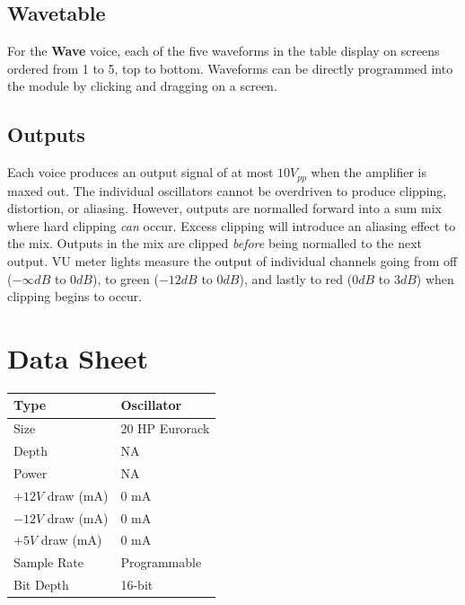 \documentclass[12pt,letter]{article}
\begin{document}
\subsection{Wavetable}

For the \textbf{Wave} voice, each of the five waveforms in the table display on screens ordered from 1 to 5, top to bottom. Waveforms can be directly programmed into the module by clicking and dragging on a screen.

\subsection{Outputs}

Each voice produces an output signal of at most $10V_{pp}$ when the amplifier is maxed out. The individual oscillators cannot be overdriven to produce clipping, distortion, or aliasing. However, outputs are normalled forward into a sum mix where hard clipping \textit{can} occur. Excess clipping will introduce an aliasing effect to the mix. Outputs in the mix are clipped \textit{before} being normalled to the next output. VU meter lights measure the output of individual channels going from off ($-\infty dB$ to $0dB$), to green ($-12dB$ to $0dB$), and lastly to red ($0dB$ to $3dB$) when clipping begins to occur.


\clearpage
\section{Data Sheet}

\begin{table}[!htp]
\begin{tabular}{|l|l|}
\hline
Type             & Oscillator               \\
\hline
Size             & 20 HP Eurorack           \\
\hline
Depth            & NA                       \\
\hline
Power            & NA                       \\ %
\hline
$+12V$ draw (mA) & 0 mA                     \\
\hline
$-12V$ draw (mA) & 0 mA                     \\
\hline
$+5V$ draw (mA)  & 0 mA                     \\
\hline
Sample Rate      & Programmable             \\
\hline
Bit Depth        & 16-bit                   \\
\hline
\end{tabular}
\end{table}


\clearpage
\renewcommand\refname{References}
\nocite{*}


\end{document}
